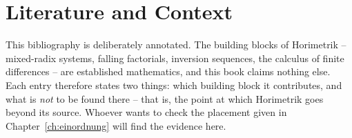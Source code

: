 \chapter*{Literature and Context}

This bibliography is deliberately annotated. The building blocks
of Horimetrik -- mixed-radix systems, falling factorials,
inversion sequences, the calculus of finite differences -- are
established mathematics, and this book claims nothing else. Each
entry therefore states two things: which building block it
contributes, and what is \emph{not} to be found there -- that is,
the point at which Horimetrik goes beyond its source. Whoever
wants to check the placement given in
Chapter~\ref{ch:einordnung} will find the evidence here.

